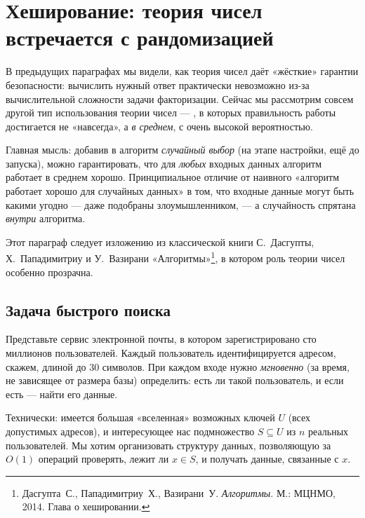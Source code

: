 \section{Хеширование: теория чисел встречается с рандомизацией}
\label{sec:hashing}

В предыдущих параграфах мы видели, как теория чисел даёт «жёсткие» гарантии безопасности: вычислить нужный ответ практически невозможно из-за вычислительной сложности задачи факторизации. Сейчас мы рассмотрим совсем другой тип использования теории чисел --- , в которых правильность работы достигается не «навсегда», а \emph{в среднем}, с очень высокой вероятностью.

Главная мысль: добавив в алгоритм \emph{случайный выбор} (на этапе настройки, ещё до запуска), можно гарантировать, что для \emph{любых} входных данных алгоритм работает в среднем хорошо. Принципиальное отличие от наивного «алгоритм работает хорошо для случайных данных» в том, что входные данные могут быть какими угодно --- даже подобраны злоумышленником, --- а случайность спрятана \emph{внутри} алгоритма.

Этот параграф следует изложению из классической книги С.\ Дасгупты, Х.\ Пападимитриу и У.\ Вазирани «Алгоритмы»\footnote{Дасгупта~С., Пападимитриу~Х., Вазирани~У. \emph{Алгоритмы}. М.: МЦНМО, 2014. Глава о хешировании.}, в котором роль теории чисел особенно прозрачна.

\subsection{Задача быстрого поиска}

Представьте сервис электронной почты, в котором зарегистрировано сто миллионов пользователей. Каждый пользователь идентифицируется адресом, скажем, длиной до 30 символов. При каждом входе нужно \emph{мгновенно} (за время, не зависящее от размера базы) определить: есть ли такой пользователь, и если есть --- найти его данные.

Технически: имеется большая «вселенная» возможных ключей $U$ (всех допустимых адресов), и интересующее нас подмножество $S \subseteq U$ из $n$ реальных пользователей. Мы хотим организовать структуру данных, позволяющую за $O(1)$ операций проверять, лежит ли $x \in S$, и получать данные, связанные с $x$.

